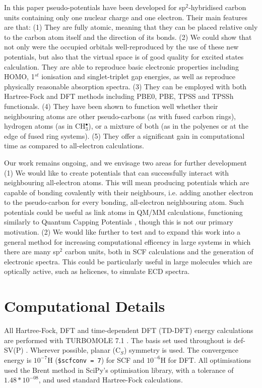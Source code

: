 \documentclass[12pt]{article}
\begin{document}
In this paper pseudo-potentials have been developed for sp$^{2}$-hybridised carbon units containing only one nuclear charge and one electron. 
Their main features are that: 
(1) They are fully atomic, meaning that they can be placed relative only to the carbon atom itself and the direction of its bonds. 
(2) We could show that not only were the occupied orbitals well-reproduced by the use of these new potentials, but also that the virtual space is of good quality for excited states calculation. 
They are able to reproduce basic electronic properties including HOMO, 1$^{st}$ ionisation and singlet-triplet gap energies, as well as reproduce physically reasonable absorption spectra. 
(3) They can be employed with both Hartree-Fock and DFT methods including PBE0, PBE, TPSS and TPSSh functionals. 
(4) They have been shown to function well whether their neighbouring atoms are other pseudo-carbons (as with fused carbon rings), hydrogen atoms (as in CH\(^{\bullet}_{3}\)), or a mixture of both (as in the polyenes or at the edge of fused ring systems). 
(5) They offer a significant gain in computational time as compared to all-electron calculations.

Our work remains ongoing, and we envisage two areas for further development (1) We would like to create potentials that can successfully interact with neighbouring all-electron atoms. This will mean producing potentials which are capable of bonding covalently with their neighbours, i.e. adding another electron to the pseudo-carbon for every bonding, all-electron neighbouring atom. Such potentials could be useful as link atoms in QM/MM calculations, functioning similarly to Quantum Capping Potentials \cite{dilabio_simple_2002}, though this is not our primary motivation. (2) We would like further to test and to expand this work into a general method for increasing computational efficency in large systems in which there are many sp$^{2}$ carbon units, both in SCF calculations and the generation of electronic spectra. This could be particularly useful in large molecules which are optically active, such as helicenes, to simulate ECD spectra.

\section*{\sffamily \large Computational Details}

All Hartree-Fock, DFT and time-dependent DFT (TD-DFT) energy calculations are performed with TURBOMOLE 7.1 \cite{TURBOMOLE}. The basis set used throughout is def-SV(P) \cite{defsvp}. Wherever possible, planar (C\(_{S}\)) symmetry is used. The convergence energy is \(10^{-7}\)H (\texttt{\$scfconv = 7}) for SCF and \(10^{-6}\)H for DFT. All optimisations used the Brent method in SciPy's optimisation library, with a tolerance of \(1.48*10^{-08}\), and used standard Hartree-Fock calculations.\cite{scipy}
\end{document}
